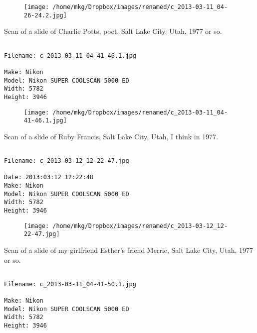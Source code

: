 \begin{figure}
\texttt{[image: /home/mkg/Dropbox/images/renamed/c\_2013-03-11\_04-26-24.2.jpg]}
\end{figure}
    
\clearpage
\onecolumn
\noindent Scan of a slide of Charlie Potts, poet, Salt Lake City, Utah, 1977 or so.
\noindent
\begin{lstlisting}

Filename: c_2013-03-11_04-41-46.1.jpg

Make: Nikon
Model: Nikon SUPER COOLSCAN 5000 ED
Width: 5782
Height: 3946
\end{lstlisting}
\clearpage

\begin{figure}
\texttt{[image: /home/mkg/Dropbox/images/renamed/c\_2013-03-11\_04-41-46.1.jpg]}
\end{figure}
    
\clearpage
\onecolumn
\noindent Scan of a slide of Ruby Francis, Salt Lake City, Utah, I think in 1977.
\noindent
\begin{lstlisting}

Filename: c_2013-03-12_12-22-47.jpg

Date: 2013:03:12 12:22:48
Make: Nikon
Model: Nikon SUPER COOLSCAN 5000 ED
Width: 5782
Height: 3946
\end{lstlisting}
\clearpage

\begin{figure}
\texttt{[image: /home/mkg/Dropbox/images/renamed/c\_2013-03-12\_12-22-47.jpg]}
\end{figure}
    
\clearpage
\onecolumn
\noindent Scan of a slide of my girlfriend Esther's friend Merrie, Salt Lake City, Utah, 1977 or so.
\noindent
\begin{lstlisting}

Filename: c_2013-03-11_04-41-50.1.jpg

Make: Nikon
Model: Nikon SUPER COOLSCAN 5000 ED
Width: 5782
Height: 3946
\end{lstlisting}
\clearpage

